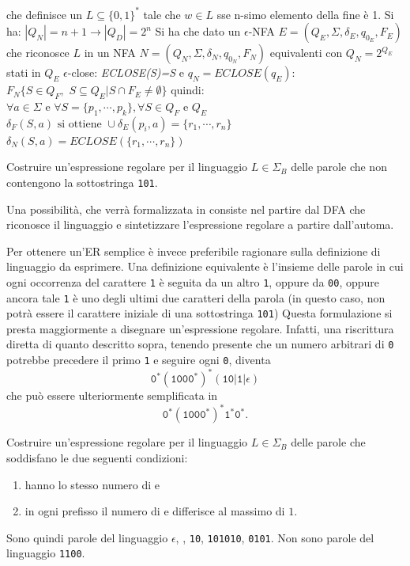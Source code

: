 che definisce un $L\subseteq\{0,1\}^*$ tale che $w\in L$ sse n-simo elemento della fine è 1. Si ha:
$|Q_N|=n+1\to |Q_D|=2^n$
Si ha che dato un $\epsilon$-NFA $E=(Q_E, \Sigma, \delta_E, q_{0_E}, F_E)$ che riconosce $L$ in un NFA $N=(Q_N, \Sigma, \delta_N, q_{0_N}, F_N)$ equivalenti con $Q_N=2^{Q_E}$ stati in $Q_E$ $\epsilon$-close: \textit{ECLOSE(S)=S} e $q_N=ECLOSE(q_E)$:
$F_N\{S\in Q_F,\,\, S\subseteq Q_E | S\cap F_E\neq \emptyset\}$
quindi:
$\forall a\in \Sigma \text{ e } \forall S=\{p_1,\cdots,p_k\}, \forall S\in Q_F \text{ e } Q_E$
$\delta_F(S,a) \text{ si ottiene }\cup \delta_E(p_i,a)=\{r_1,\cdots, r_n\}$
$\delta_N(S,a)=ECLOSE(\{r_1, \cdots, r_n\})$

\begin{Exercise}\label{exe:no-101-er}
Costruire un'espressione regolare per il linguaggio $L\in\Sigma_{B}$ delle parole che non contengono la sottostringa \texttt{101}.
\end{Exercise}

\begin{Answer}
Una possibilità, che verrà formalizzata in  consiste nel partire dal DFA che riconosce il
linguaggio e sintetizzare l'espressione regolare a partire dall'automa.

Per ottenere un'ER semplice è invece preferibile ragionare sulla definizione di linguaggio da esprimere.
Una definizione equivalente è l'insieme delle parole in cui ogni occorrenza del carattere \texttt{1} è seguita da un
altro \texttt{1}, oppure da \texttt{00}, oppure ancora tale \texttt{1} è uno degli ultimi due caratteri della parola (in
questo caso, non potrà essere il carattere iniziale di una sottostringa \texttt{101})
Questa formulazione si presta maggiormente a disegnare un'espressione regolare.
Infatti, una riscrittura diretta di quanto descritto sopra, tenendo presente che un numero arbitrari di \texttt{0}
potrebbe precedere il primo \texttt{1} e seguire ogni \texttt{0}, diventa
$$\texttt{0}^{*}(\texttt{100}\texttt{0}^{*})^{*} (\texttt{10} |\texttt{1} | \epsilon)$$ che può essere ulteriormente
semplificata in
$$\texttt{0}^{*}(\texttt{100}\texttt{0}^{*})^{*} \texttt{1}^{*} \texttt{0}^{*}.$$
\end{Answer}



\begin{Exercise}\label{exe:no-diff2-er}
Costruire un'espressione regolare per il linguaggio $L\in\Sigma_{B}$ delle parole che soddisfano le due seguenti
condizioni:
\begin{enumerate}
\item hanno lo stesso numero di \zero e \uno
\item in ogni prefisso il numero di \zero e \uno differisce al massimo di $1$.
\end{enumerate}
Sono quindi parole del linguaggio $\epsilon$, \zero\uno, \texttt{10}, \texttt{101010}, \texttt{0101}.
Non sono parole del linguaggio \texttt{1100}.
\end{Exercise}

